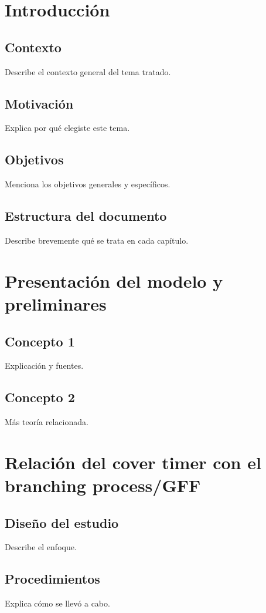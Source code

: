 \documentclass[12pt]{report}
\begin{document}
\tableofcontents
\newpage

\chapter{Introducción}
\section{Contexto}
Describe el contexto general del tema tratado.

\section{Motivación}
Explica por qué elegiste este tema.

\section{Objetivos}
Menciona los objetivos generales y específicos.

\section{Estructura del documento}
Describe brevemente qué se trata en cada capítulo.

\chapter{Presentación del modelo y preliminares}
\section{Concepto 1}
Explicación y fuentes.

\section{Concepto 2}
Más teoría relacionada.

\chapter{Relación del cover timer con el branching process/GFF}
\section{Diseño del estudio}
Describe el enfoque.

\section{Procedimientos}
Explica cómo se llevó a cabo.
\end{document}
